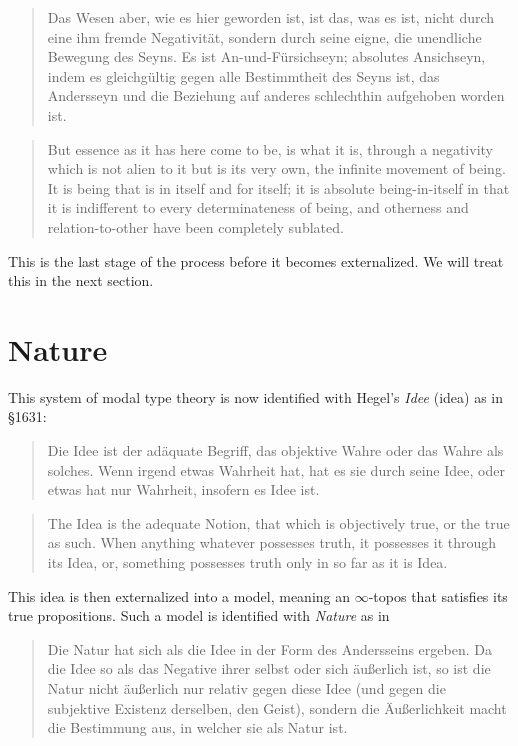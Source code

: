 \documentclass{article}
\begin{document}
\begin{quote}
    Das Wesen aber, wie es hier geworden ist, ist das, was es ist, nicht durch eine ihm fremde Negativität, sondern durch seine eigne, die unendliche Bewegung des Seyns. Es ist An-und-Fürsichseyn; absolutes Ansichseyn, indem es gleichgültig gegen alle Bestimmtheit des Seyns ist, das Andersseyn und die Beziehung auf anderes schlechthin aufgehoben worden ist.
\end{quote}

\begin{quote}
    But essence as it has here come to be, is what it is, through a negativity which is not alien to it but is its very own, the infinite movement of being. It is being that is in itself and for itself; it is absolute being-in-itself in that it is indifferent to every determinateness of being, and otherness and relation-to-other have been completely sublated.
\end{quote}

This is the last stage of the process before it becomes externalized. We will treat this in the next section.


\section{Nature}
This system of modal type theory is now identified with Hegel's \emph{Idee} (idea) as in §1631:

\begin{quote}
    Die Idee ist der adäquate Begriff, das objektive Wahre oder das Wahre als solches. Wenn irgend etwas
Wahrheit hat, hat es sie durch seine Idee, oder etwas hat nur Wahrheit, insofern es Idee ist.
\end{quote}

\begin{quote}
    The Idea is the adequate Notion, that which is objectively true, or the true as such. When anything
whatever possesses truth, it possesses it through its Idea, or, something possesses truth only in so far
as it is Idea.
\end{quote}

This idea is then externalized into a model, meaning an $\infty$-topos that satisfies its true propositions.
Such a model is identified with \emph{Nature} as in 

\begin{quote}
    Die Natur hat sich als die Idee in der Form des Andersseins ergeben. Da die Idee so als das Negative
ihrer selbst oder sich äußerlich ist, so ist die Natur nicht äußerlich nur relativ gegen diese Idee (und
gegen die subjektive Existenz derselben, den Geist), sondern die Äußerlichkeit macht die Bestimmung aus,
in welcher sie als Natur ist.
\end{quote}
\end{document}
